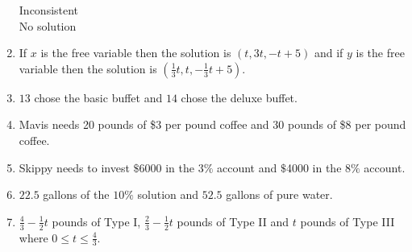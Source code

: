 \begin{enumerate}
\begin{multicols}{2}
Inconsistent\\
No solution

\end{multicols}

\item If $x$ is the free variable then the solution is $(t, 3t, -t + 5)$ and if $y$ is the free variable then the solution is $\left(\frac{1}{3}t, t, -\frac{1}{3}t + 5\right)$.

\item  $13$ chose the basic buffet and $14$ chose the deluxe buffet.

\item Mavis needs 20 pounds of \$3 per pound coffee and 30 pounds of \$8 per pound coffee.

\item  Skippy needs to invest $\$$6000 in the $3\%$ account and $\$$4000 in the $8 \%$ account.

\item  $22.5$ gallons of the $10 \%$ solution and $52.5$ gallons of pure water.

\item $\frac{4}{3}- \frac{1}{2}t$ pounds of Type I, $\frac{2}{3} - \frac{1}{2}t$ pounds of Type II and $t$ pounds of Type III where $0 \leq t \leq \frac{4}{3}$.

\end{enumerate}

\closegraphsfile